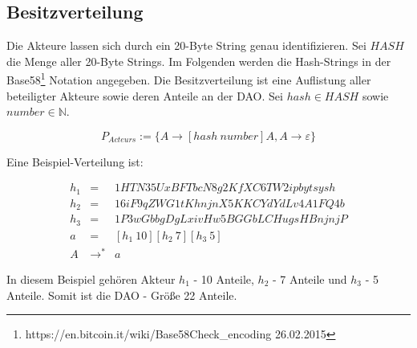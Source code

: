 \documentclass[a4paper,12pt]{report}
\begin{document}
% 
% 
% 
% 


\subsection*{Besitzverteilung}
Die Akteure lassen sich durch ein 20-Byte String genau identifizieren. Sei $HASH$ die Menge aller 20-Byte Strings. Im Folgenden werden die Hash-Strings in der Base58\footnote{https://en.bitcoin.it/wiki/Base58Check\_encoding 26.02.2015} Notation angegeben. Die Besitzverteilung ist eine Auflistung aller beteiligter Akteure sowie deren Anteile an der DAO.
Sei $hash\in HASH$ sowie $number\in\mathbb{N}$.

\[ P_{Acteurs} := \{A\rightarrow[hash\ number]A,A\rightarrow \varepsilon\} \] 

Eine Beispiel-Verteilung ist: 

\begin{eqnarray}
  h_1 &=& 1HTN35UxBFTbcN8g2KfXC6TW2ipbytsysh\\
  h_2 &=& 16iF9qZWG1tKhnjnX5KKCYdYdLv4A1FQ4b\\
  h_3 &=& 1P3wGbbgDgLxivHw5BGGbLCHugsHBnjnjP\\
  a &=& [h_1\ 10][h_2\ 7][h_3\ 5] \\
  A &\rightarrow^*& a
\end{eqnarray}

In diesem Beispiel gehören Akteur $h_1$ - 10 Anteile, $h_2$ - 7 Anteile und $h_3$ - 5 Anteile. Somit ist die DAO - Größe 22 Anteile.

\end{document}
